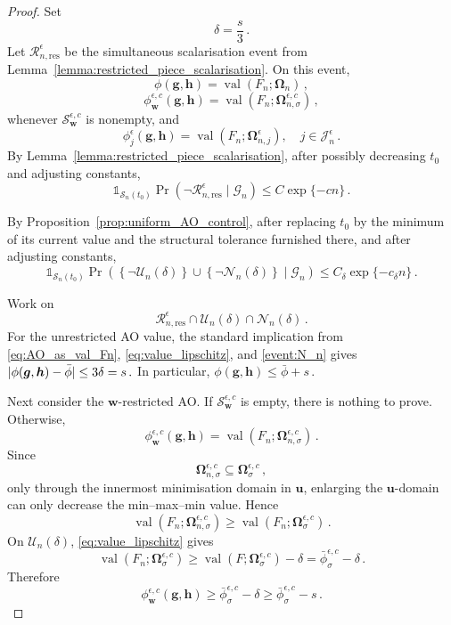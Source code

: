 \documentclass{article}
\makeatletter
\theoremstyle{definition}
\newcommand{\abs}[1]{%
	\ensuremath{%
		\if@display
		\left| #1 \right|
		\else
		\lvert #1 \rvert
		\fi
	}%
}
\newcommand*{\bb}{\boldsymbol}
\def\bw {\bb{w}}
\def\bu{\bb{u}}
\def\bh{\bb{h}}
\def\bg{\bb{g}}
\makeatother
\begin{document}
\begin{bibunit}
\begin{proof}
	Set
	$$
		\delta=\frac{s}{3}\,.
	$$
	Let $\mathcal R_{n,\mathrm{res}}^\epsilon$ be the simultaneous
	scalarisation event from Lemma~\ref{lemma:restricted_piece_scalarisation}.
	On this event,
	$$
		\phi(\bg,\bh)
		=
		\operatorname{val}
		\left(
			F_n;
			\bb\Omega_n
		\right)\,,
	$$
	$$
		\phi_{\bw}^{\epsilon,c}(\bg,\bh)
		=
		\operatorname{val}
			\left(
				F_n;
				\bb\Omega_{n,\sigma}^{\epsilon,c}
			\right)\,,
		$$
	whenever $\mathcal S_{\bw}^{\epsilon,c}$ is nonempty, and
	$$
		\phi_j^\epsilon(\bg,\bh)
		=
		\operatorname{val}
		\left(
			F_n;
			\bb\Omega_{n,j}^{\epsilon}
		\right),
		\quad j\in\mathcal J_n^\epsilon\,.
	$$
	By Lemma~\ref{lemma:restricted_piece_scalarisation}, after possibly
	decreasing $t_0$ and adjusting constants,
	$$
		\mathds{1}_{\mathcal S_n(t_0)}
		\Pr\left(
			\lnot\mathcal R_{n,\mathrm{res}}^\epsilon
			\mid
			\mathcal G_n
		\right)
		\le
		C\exp\{-cn\}\,.
	$$

	By Proposition~\ref{prop:uniform_AO_control}, after replacing
	$t_0$ by the minimum of its current value and the structural
	tolerance furnished there, and after adjusting constants,
	$$
		\mathds{1}_{\mathcal S_n(t_0)}
		\Pr\left(
			\left\{\lnot\mathcal U_n(\delta)\right\}
			\cup
			\left\{\lnot\mathcal N_n(\delta)\right\}
			\mid
			\mathcal G_n
		\right)
		\le
		C_\delta\exp\{-c_\delta n\}\,.
	$$

	Work on
	$$
		\mathcal R_{n,\mathrm{res}}^\epsilon
		\cap
		\mathcal U_n(\delta)
		\cap
		\mathcal N_n(\delta)\,.
	$$
	For the unrestricted AO value, the standard implication from
	\eqref{eq:AO_as_val_Fn}, \eqref{eq:value_lipschitz}, and
	\eqref{event:N_n} gives $\abs{\phi(\bg,\bh)-\bar\phi} \le 3\delta=s\,.$
	In particular, $\phi(\bg,\bh)\le\bar\phi+s\,.$

	Next consider the $\bw$-restricted AO. If
	$\mathcal S_{\bw}^{\epsilon,c}$ is empty, there is nothing to prove.
	Otherwise,
	$$
		\phi_{\bw}^{\epsilon,c}(\bg,\bh)
		=
		\operatorname{val}
		\left(
			F_n;
			\bb\Omega_{n,\sigma}^{\epsilon,c}
		\right) \,.
	$$
	Since
	$$
		\bb\Omega_{n,\sigma}^{\epsilon,c}
		\subseteq
		\bb\Omega_{\sigma}^{\epsilon,c}\,,
		$$
	only through the innermost minimisation domain in $\bu$, enlarging the
	$\bu$-domain can only decrease the min--max--min value. Hence
	$$
		\operatorname{val}
		\left(
			F_n;
			\bb\Omega_{n,\sigma}^{\epsilon,c}
		\right)
		\ge
		\operatorname{val}
		\left(
			F_n;
			\bb\Omega_{\sigma}^{\epsilon,c}
		\right) \,.
	$$
	On $\mathcal U_n(\delta)$, \eqref{eq:value_lipschitz} gives
$$
    \operatorname{val}
    \left(
        F_n;
        \bb\Omega_{\sigma}^{\epsilon,c}
    \right)
    \geq
    \operatorname{val}
    \left(
        F;
        \bb\Omega_{\sigma}^{\epsilon,c}
    \right)
    -
    \delta
    =
    \bar\phi_{\sigma}^{\epsilon,c}-\delta \,.
$$
Therefore
$$
    \phi_{\bw}^{\epsilon,c}(\bg,\bh)
    \geq
    \bar\phi_{\sigma}^{\epsilon,c}-\delta
    \geq
    \bar\phi_{\sigma}^{\epsilon,c}-s \,.
$$


\end{proof}
\end{bibunit}
\end{document}
